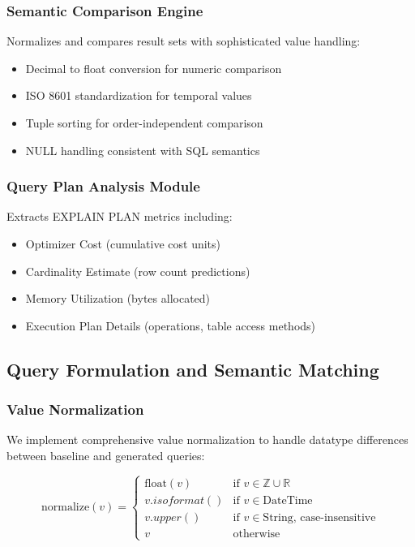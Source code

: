 \subsubsection{Semantic Comparison Engine}
Normalizes and compares result sets with sophisticated value handling:
\begin{itemize}
    \item Decimal to float conversion for numeric comparison
    \item ISO 8601 standardization for temporal values
    \item Tuple sorting for order-independent comparison
    \item NULL handling consistent with SQL semantics
\end{itemize}

\subsubsection{Query Plan Analysis Module}
Extracts EXPLAIN PLAN metrics including:
\begin{itemize}
    \item Optimizer Cost (cumulative cost units)
    \item Cardinality Estimate (row count predictions)
    \item Memory Utilization (bytes allocated)
    \item Execution Plan Details (operations, table access methods)
\end{itemize}

\subsection{Query Formulation and Semantic Matching}

\subsubsection{Value Normalization}

We implement comprehensive value normalization to handle datatype differences between baseline and generated queries:

\begin{equation}
\text{normalize}(v) = \begin{cases}
    \text{float}(v) & \text{if } v \in \mathbb{Z} \cup \mathbb{R} \\
    v.isoformat() & \text{if } v \in \text{DateTime} \\
    v.upper() & \text{if } v \in \text{String, case-insensitive} \\
    v & \text{otherwise}
\end{cases}
\end{equation}

